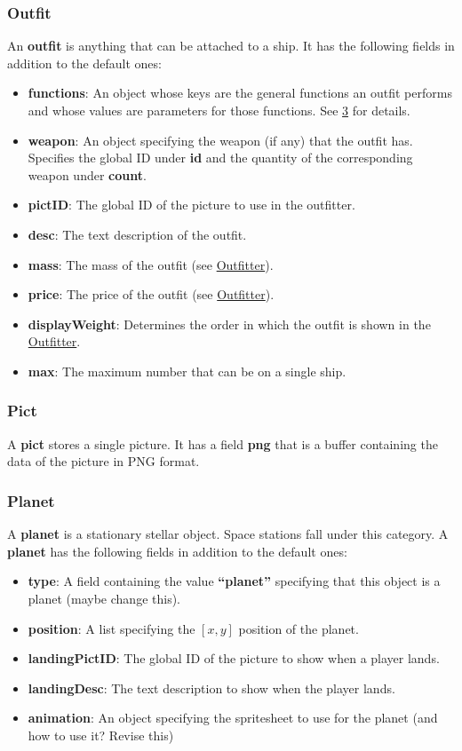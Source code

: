 \documentclass{article}
\begin{document}
\subsubsection{Outfit}
An \textbf{outfit} is anything that can be attached to a ship. It has the following fields in addition to the default ones:
\begin{itemize}
\item{\textbf{functions}}: An object whose keys are the general functions an outfit performs and whose values are parameters for those functions. See \href{outfit-functions}{3} for details.
\item{\textbf{weapon}}: An object specifying the weapon (if any) that the outfit has. Specifies the global ID under \textbf{id} and the quantity of the corresponding weapon under \textbf{count}.
\item{\textbf{pictID}}: The global ID of the picture to use in the outfitter.
\item{\textbf{desc}}: The text description of the outfit.
\item{\textbf{mass}}: The mass of the outfit (see \href{outfitter}{Outfitter}).
\item{\textbf{price}}: The price of the outfit (see \href{outfitter}{Outfitter}).
\item{\textbf{displayWeight}}: Determines the order in which the outfit is shown in the \href{outfitter}{Outfitter}.
\item{\textbf{max}}: The maximum number that can be on a single ship.
\end{itemize}

\subsubsection{Pict}
A \textbf{pict} stores a single picture. It has a field \textbf{png} that is a buffer containing the data of the picture in PNG format.

\subsubsection{Planet}
A \textbf{planet} is a stationary stellar object. Space stations fall under this category. A \textbf{planet} has the following fields in addition to the default ones:
\begin{itemize}
\item{\textbf{type}}: A field containing the value \textbf{``planet''} specifying that this object is a planet (maybe change this).
\item{\textbf{position}}: A list specifying the $[x,y]$ position of the planet.
\item{\textbf{landingPictID}}: The global ID of the picture to show when a player lands.
\item{\textbf{landingDesc}}: The text description to show when the player lands.
\item{\textbf{animation}}: An object specifying the spritesheet to use for the planet (and how to use it? Revise this)
\end{itemize}
\end{document}
